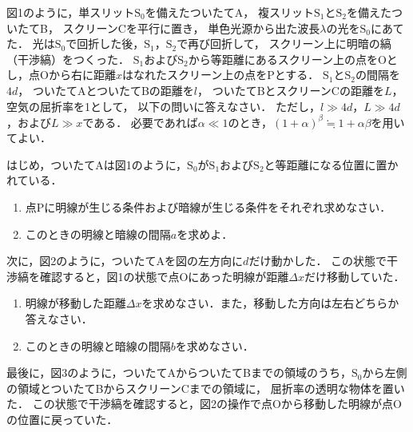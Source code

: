 \setcounter{figure}{0}
図1のように，単スリット$\text{S}_0$を備えたついたてA，
複スリット$\text{S}_1$と$\text{S}_2$を備えたついたてB，
スクリーンCを平行に置き，
単色光源から出た波長$\lambda$の光を$\text{S}_0$にあてた．
光は$\text{S}_0$で回折した後，$\text{S}_1，\text{S}_2$で再び回折して，
スクリーン上に明暗の縞（干渉縞）をつくった．
$\text{S}_1$および$\text{S}_2$から等距離にあるスクリーン上の点をOとし，点Oから右に距離$x$はなれたスクリーン上の点をPとする．
$\text{S}_1$と$\text{S}_2$の間隔を$4d$，
ついたてAとついたてBの距離を$l$，
ついたてBとスクリーンCの距離を$L$，
空気の屈折率を1として，
以下の問いに答えなさい．
ただし，$l\gg 4d$，$L\gg 4d$，および$L\gg x$である．
必要であれば$\alpha\ll 1$のとき，$(1+\alpha)^\beta \fallingdotseq 1+\alpha\beta$を用いてよい．

はじめ，ついたてAは図1のように，$\text{S}_0$が$\text{S}_1$および$\text{S}_2$と等距離になる位置に置かれている．

\begin{enumerate}[（1）]
  \setlength{\leftskip}{-1.5zw}
  \setlength{\itemindent}{1zw}\setlength{\labelsep}{0.5zw}
  \setlength{\labelwidth}{1zw}\setlength{\leftmargin}{1zw}
  \setlength{\itemsep}{0.5\baselineskip}
  \item 点Pに明線が生じる条件および暗線が生じる条件をそれぞれ求めなさい．
  \item このときの明線と暗線の間隔$a$を求めよ．
\end{enumerate}

次に，図2のように，ついたてAを図の左方向に$d$だけ動かした．
この状態で干渉縞を確認すると，図1の状態で点Oにあった明線が距離$\Delta x$だけ移動していた．

\begin{enumerate}[（1）]
  \setlength{\leftskip}{-1.5zw}
  \setlength{\itemindent}{1zw}\setlength{\labelsep}{0.5zw}
  \setlength{\labelwidth}{1zw}\setlength{\leftmargin}{1zw}
  \setlength{\itemsep}{0.5\baselineskip}
  \addtocounter{enumi}{2}
  \item 明線が移動した距離$\Delta x$を求めなさい．また，移動した方向は左右どちらか答えなさい．
  \item このときの明線と暗線の間隔$b$を求めなさい．
\end{enumerate}

最後に，図3のように，ついたてAからついたてBまでの領域のうち，$\text{S}_0$から左側の領域とついたてBからスクリーンCまでの領域に，
屈折率\nn の透明な物体を置いた．
この状態で干渉縞を確認すると，図2の操作で点Oから移動した明線が点Oの位置に戻っていた．

